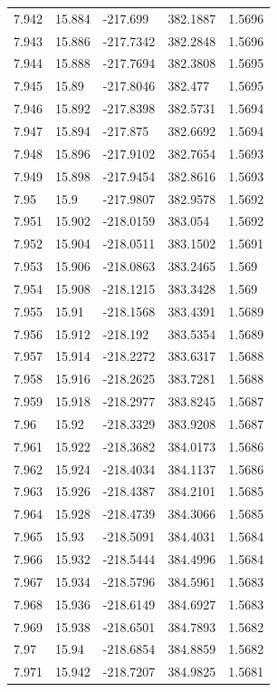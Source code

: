 \begin{tabular}{lllll}
7.942 & 15.884 & -217.699 & 382.1887 & 1.5696 \\
7.943 & 15.886 & -217.7342 & 382.2848 & 1.5696 \\
7.944 & 15.888 & -217.7694 & 382.3808 & 1.5695 \\
7.945 & 15.89 & -217.8046 & 382.477 & 1.5695 \\
7.946 & 15.892 & -217.8398 & 382.5731 & 1.5694 \\
7.947 & 15.894 & -217.875 & 382.6692 & 1.5694 \\
7.948 & 15.896 & -217.9102 & 382.7654 & 1.5693 \\
7.949 & 15.898 & -217.9454 & 382.8616 & 1.5693 \\
7.95 & 15.9 & -217.9807 & 382.9578 & 1.5692 \\
7.951 & 15.902 & -218.0159 & 383.054 & 1.5692 \\
7.952 & 15.904 & -218.0511 & 383.1502 & 1.5691 \\
7.953 & 15.906 & -218.0863 & 383.2465 & 1.569 \\
7.954 & 15.908 & -218.1215 & 383.3428 & 1.569 \\
7.955 & 15.91 & -218.1568 & 383.4391 & 1.5689 \\
7.956 & 15.912 & -218.192 & 383.5354 & 1.5689 \\
7.957 & 15.914 & -218.2272 & 383.6317 & 1.5688 \\
7.958 & 15.916 & -218.2625 & 383.7281 & 1.5688 \\
7.959 & 15.918 & -218.2977 & 383.8245 & 1.5687 \\
7.96 & 15.92 & -218.3329 & 383.9208 & 1.5687 \\
7.961 & 15.922 & -218.3682 & 384.0173 & 1.5686 \\
7.962 & 15.924 & -218.4034 & 384.1137 & 1.5686 \\
7.963 & 15.926 & -218.4387 & 384.2101 & 1.5685 \\
7.964 & 15.928 & -218.4739 & 384.3066 & 1.5685 \\
7.965 & 15.93 & -218.5091 & 384.4031 & 1.5684 \\
7.966 & 15.932 & -218.5444 & 384.4996 & 1.5684 \\
7.967 & 15.934 & -218.5796 & 384.5961 & 1.5683 \\
7.968 & 15.936 & -218.6149 & 384.6927 & 1.5683 \\
7.969 & 15.938 & -218.6501 & 384.7893 & 1.5682 \\
7.97 & 15.94 & -218.6854 & 384.8859 & 1.5682 \\
7.971 & 15.942 & -218.7207 & 384.9825 & 1.5681 \\

\end{tabular}
